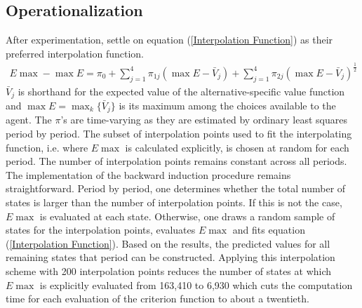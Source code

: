 \subsection{Operationalization}
After experimentation, \citet{Keane.1994} settle on equation (\ref{Interpolation Function}) as their preferred interpolation function.
%
\begin{align}\label{Interpolation Function}
E \max - \max E = \pi_0 + \sum^4_{j = 1} \pi_{1j} (\max E - \bar{V}_j) +
\sum^4_{j = 1} \pi_{2j} \left(\max E - \bar{V}_j\right)^{\tfrac{1}{2}}
\end{align}
%
$\bar{V}_j$ is shorthand for the expected value of the alternative-specific value function and $\max E = \max_k\{\bar{V}_j\}$ is its maximum among the choices available to the agent. The $\pi$'s are time-varying as they are estimated by ordinary least squares period by period. The subset of interpolation points used to fit the interpolating function, i.e. where $E\max$ is calculated explicitly, is chosen at random for each period. The number of interpolation points remains constant across all periods.\\\newline
%
The implementation of the backward induction procedure remains straightforward. Period by period, one determines whether the total number of states is larger than the number of interpolation points. If this is not the case, $E\max$ is evaluated at each state. Otherwise, one draws a random sample of states for the interpolation points, evaluates $E\max$ and fits equation (\ref{Interpolation Function}). Based on the results, the predicted values for all remaining states that period can be constructed. Applying this interpolation scheme with 200 interpolation points reduces the number of states at which $E\max$ is explicitly evaluated from 163,410 to 6,930 which cuts the computation time for each evaluation of the criterion function to about a twentieth.
